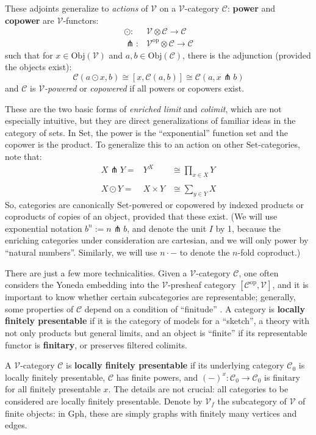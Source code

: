 \documentclass{amsart}
\theoremstyle{definition}
\newcommand{\Gph}{\mathrm{Gph}}
\newcommand{\Set}{\mathrm{Set}}
\newcommand{\op}{\mathrm{op}}
\newcommand{\V}{\mathscr{V}}
\newcommand{\C}{\mathscr{C}}
\newcommand{\pfk}{\pitchfork}
\newcommand{\maps}{\colon}
\begin{document}
These adjoints generalize to \textit{actions} of $\V$ on a $\V$-category $\C$: \textbf{power} and \textbf{copower} are $\V$-functors:
\[\begin{array}{rl}
	\odot \maps & \V \otimes \C \to \C\\
	\pfk \maps & \V^{\op} \otimes \C \to \C
\end{array}\]
such that for $x \in \text{Obj}(\V)$ and $a,b \in \text{Obj}(\C)$, there is the adjunction (provided the objects exist):
\begin{equation}\label{eq:co-power}
	\C(a\odot x,b) \cong \left[x, \C(a,b)\right] \cong \C(a,x\pfk b)
\end{equation}
and $\C$ is \textit{$\V$-powered} or \textit{copowered} if all powers or copowers exist.

These are the two basic forms of \textit{enriched limit} and \textit{colimit}, which are not especially intuitive, but they are direct generalizations of familiar ideas in the category of sets. In $\Set$, the power is the ``exponential'' function set and the copower is the product. To generalize this to an action on other $\Set$-categories, note that:
\[\begin{array}{lcr}
	X \pfk Y = & Y^X & \cong \prod_{x\in X}Y\\
	\\
	X \odot Y = & X \times Y & \cong \sum_{y\in Y}X
\end{array}\]
So, categories are canonically $\Set$-powered or copowered by indexed products or coproducts of copies of an object, provided that these exist. (We will use exponential notation $b^n := n\pfk b$, and denote the unit $I$ by 1, because the enriching categories under consideration are cartesian, and we will only power by ``natural numbers''. Similarly, we will use $n \cdot -$ to denote the $n$-fold coproduct.)

There are just a few more technicalities. Given a $\V$-category $\C$, one often considers the Yoneda embedding into the $\V$-presheaf category $[\C^\op, \V]$, and it is important to know whether certain subcategories are representable; generally, some properties of $\C$ depend on a condition of ``finitude'' \cite{finite}. A category is \textbf{locally finitely presentable} if it is the category of models for a ``sketch'', a theory with not only products but general limits, and an object is ``finite'' if its representable functor is \textbf{finitary}, or preserves filtered colimits.

A $\V$-category $\C$ is \textbf{locally finitely presentable} if its underlying category $\C_0$ is locally finitely presentable, $\C$ has finite powers, and $(-)^x\maps \C_0 \to \C_0$ is finitary for all finitely presentable $x$. The details are not crucial: all categories to be considered are locally finitely presentable. Denote by $\V_f$ the subcategory of $\V$ of finite objects: in $\Gph$, these are simply graphs with finitely many vertices and edges.\\
\end{document}
